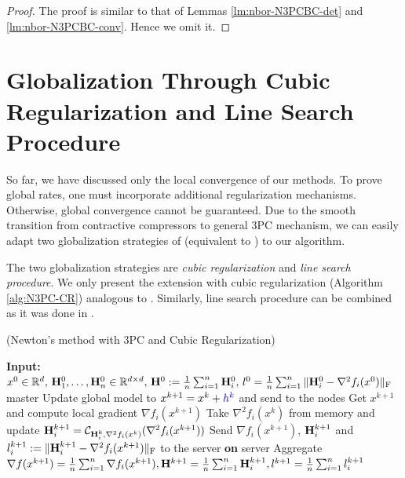 \documentclass[11pt]{article}
\begin{document}
	\begin{proof}
		
		The proof is similar to that of  Lemmas \ref{lm:nbor-N3PCBC-det} and \ref{lm:nbor-N3PCBC-conv}. Hence we omit it. 
		
	\end{proof}
	
	
	
	
	
	
	\section{Globalization Through Cubic Regularization and Line Search Procedure}
	
	So far, we have discussed only the local convergence of our methods. To prove global rates, one must incorporate additional regularization mechanisms. Otherwise, global convergence cannot be guaranteed.
	Due to the smooth transition from contractive compressors to general 3PC mechanism, we can easily adapt two globalization strategies of  (equivalent to ) to our  algorithm.
	
	The two globalization strategies are {\em cubic regularization} and {\em line search procedure}. We only present the extension with cubic regularization  (Algorithm \ref{alg:N3PC-CR}) analogous to  \citep{FedNL2021}. Similarly, line search procedure can be combined as it was done in  \citep{FedNL2021}.
	
	\begin{algorithm}[H]
		\caption{ (Newton's method with 3PC and {\color{blue}Cubic Regularization})}
		\label{alg:N3PC-CR}
		\begin{algorithmic}[1]
			\STATE \textbf{Input:} $x^0\in\mathbb{R}^d,\, \mathbf{H}_1^0, \dots, \mathbf{H}_n^0 \in \mathbb{R}^{d\times d},\, \mathbf{H}^0 \; { := }\; \frac{1}{n}\sum_{i=1}^n \mathbf{H}_i^0,\, l^0 = \frac{1}{n}\sum_{i=1}^n \|\mathbf{H}_i^0 - \nabla^2 f_i(x^0)\|_{\rm F}$
			 master
			\STATE {}
			\STATE \quad Update global model to $x^{k+1} = x^k + {\color{blue}h^k}$ and send to the nodes
			\STATE Get $x^{k+1}$ and compute local gradient $\nabla f_i(x^{k+1})$ %
			\STATE Take $\nabla^2f_i(x^k)$ from memory and update $\mathbf{H}^{k+1}_i = {\mathcal{C}}_{\mathbf{H}_i^k, \nabla^2f_i(x^k)}(\nabla^2f_i(x^{k+1}))$
			\STATE Send $\nabla f_i(x^{k+1})$,\; $\mathbf{H}^{k+1}_i$ and $l_i^{k+1} \; { := }\; \|\mathbf{H}_i^{k+1} - \nabla^2 f_i(x^{k+1})\|_{\rm F}$ to the server
			\ENDFOR
			\STATE \textbf{on} server
			\STATE \quad Aggregate $ \nabla f(x^{k+1}) = \frac{1}{n}\sum_{i=1}^n \nabla f_i(x^{k+1}), \mathbf{H}^{k+1} = \frac{1}{n}\sum_{i=1}^n\mathbf{H}_i^{k+1}, l^{k+1} = \frac{1}{n}\sum_{i=1}^n l_i^{k+1}$
		\end{algorithmic}
	\end{algorithm}
	
\end{document}
